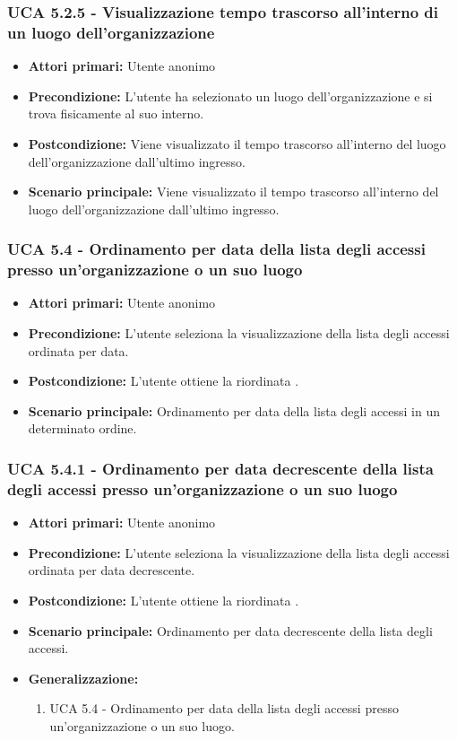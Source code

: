 \subsubsection{UCA 5.2.5 - Visualizzazione tempo trascorso all'interno di un luogo dell'organizzazione}
\begin{itemize}
	\item \textbf{Attori primari:} Utente anonimo
	\item \textbf{Precondizione:} L'utente ha selezionato un luogo dell'organizzazione e si trova fisicamente al suo interno.
	\item \textbf{Postcondizione:} Viene visualizzato il tempo trascorso all'interno del luogo dell'organizzazione dall'ultimo ingresso.
	\item \textbf{Scenario principale:} Viene visualizzato il tempo trascorso all'interno del luogo dell'organizzazione dall'ultimo ingresso.
\end{itemize}

\subsubsection{UCA 5.4 - Ordinamento per data della lista degli accessi presso un'organizzazione o un suo luogo}
\begin{itemize}
    \item \textbf{Attori primari:} Utente anonimo
    \item \textbf{Precondizione:} L'utente seleziona la visualizzazione della lista degli accessi ordinata per data.
    \item \textbf{Postcondizione:} L'utente ottiene la  riordinata .
    \item \textbf{Scenario principale:} Ordinamento per data della lista degli accessi in un determinato ordine.
\end{itemize}

\subsubsection{UCA 5.4.1 - Ordinamento per data decrescente della lista degli accessi presso un'organizzazione o un suo luogo}
\begin{itemize}
	\item \textbf{Attori primari:} Utente anonimo
	\item \textbf{Precondizione:} L'utente seleziona la visualizzazione della lista degli accessi ordinata per data decrescente.
	\item \textbf{Postcondizione:} L'utente ottiene la  riordinata .
	\item \textbf{Scenario principale:} Ordinamento per data decrescente della lista degli accessi.
	\item \textbf{Generalizzazione:}
	\begin{enumerate}
		\item UCA 5.4 - Ordinamento per data della lista degli accessi presso un'organizzazione o un suo luogo.
	\end{enumerate} 
\end{itemize}


